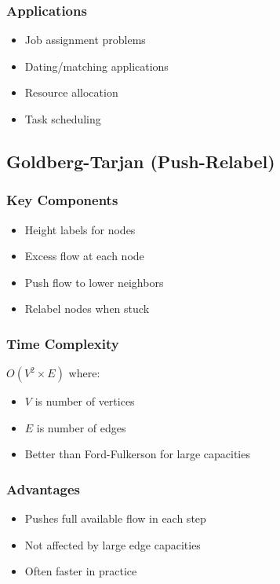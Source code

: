 \documentclass[11pt,a4paper]{article}
\begin{document}
\begin{multicols}{2}
\subsubsection{Applications}
\begin{itemize}
    \item Job assignment problems
    \item Dating/matching applications
    \item Resource allocation
    \item Task scheduling
\end{itemize}

\subsection{Goldberg-Tarjan (Push-Relabel)}
\subsubsection{Key Components}
\begin{itemize}
    \item Height labels for nodes
    \item Excess flow at each node
    \item Push flow to lower neighbors
    \item Relabel nodes when stuck
\end{itemize}

\subsubsection{Time Complexity}
$O(V^2 \times E)$ where:
\begin{itemize}
    \item $V$ is number of vertices
    \item $E$ is number of edges
    \item Better than Ford-Fulkerson for large capacities
\end{itemize}

\subsubsection{Advantages}
\begin{itemize}
    \item Pushes full available flow in each step
    \item Not affected by large edge capacities
    \item Often faster in practice
\end{itemize}


\end{multicols}
\end{document}
